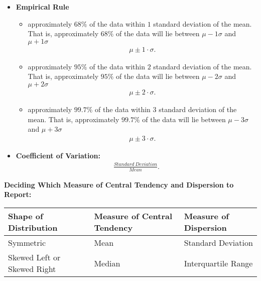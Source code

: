 \documentclass{report}
\begin{document}
\begin{itemize}
        \item \textbf{Empirical Rule}
          \begin{itemize}
             \item approximately $68\% $ of the data within $1 $ standard deviation of the mean. That is, approximately $68\% $  of the data will lie between $\mu-1 \sigma $ and $\mu + 1 \sigma $ 
               \begin{align*}
                 \mu \pm 1\cdot \sigma
               .\end{align*}
             \item approximately $95\% $ of the data within $2 $ standard deviation of the mean. That is, approximately $95\% $  of the data will lie between $\mu-2 \sigma $ and $\mu + 2 \sigma $ 
               \begin{align*}
                 \mu \pm 2 \cdot \sigma
               .\end{align*}
             \item approximately $99.7\% $ of the data within $3 $ standard deviation of the mean. That is, approximately $99.7\% $  of the data will lie between $\mu-3 \sigma $ and $\mu + 3 \sigma $ 
               \begin{align*}
                 \mu \pm 3 \cdot \sigma
               .\end{align*}
             \end{itemize}
         \item \textbf{Coefficient of Variation:}
            \begin{align*}
              \frac{Standard\ Deviation}{Mean}
            .\end{align*}
        \end{itemize}

           \pagebreak \bigbreak \noindent
       \textbf{Deciding Which Measure of Central Tendency and Dispersion to Report:}
       \bigbreak \noindent 
       \begin{center}
           \begin{tabular}{|l|l|l|}
            \hline
            Shape of Distribution & Measure of Central Tendency & Measure of Dispersion \\
            \hline
            Symmetric & Mean & Standard Deviation \\
            \hline
            Skewed Left or Skewed Right & Median & Interquartile Range \\
            \hline
            \end{tabular}
       \end{center}
       \bigbreak \noindent 
\end{document}
